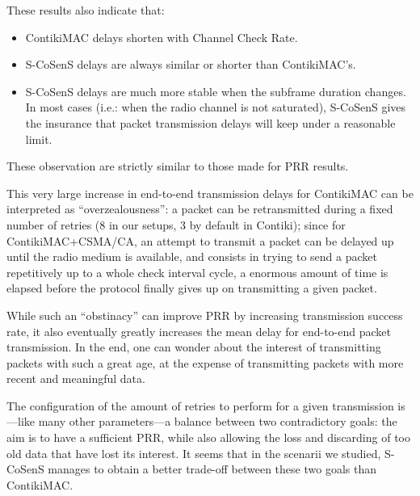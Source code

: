 \documentclass[12pt,a4paper]{article}
\begin{document}
\begin{observ}
These results also indicate that:

\begin{itemize}

\item ContikiMAC delays shorten with Channel Check Rate.

\item S-CoSenS delays are always similar or shorter than ContikiMAC's.

\item S-CoSenS delays are much more stable when the subframe duration
      changes. In most cases (i.e.: when the radio channel is not saturated),
      S-CoSenS gives the insurance that packet transmission delays will keep
      under a reasonable limit.

\end{itemize}

These observation are strictly similar to those made for PRR results.
\end{observ}

This very large increase in end-to-end transmission delays for ContikiMAC
can be interpreted as ``overzealousness'': a packet can be retransmitted
during a fixed number of retries (8 in our setups, 3 by default in Contiki);
since for ContikiMAC+CSMA/CA, an attempt to transmit a packet can be delayed
up until the radio medium is available, and consists in trying to send
a packet repetitively up to a whole check interval cycle, a enormous
amount of time is elapsed before the protocol finally gives up
on transmitting a given packet.

While such an ``obstinacy'' can improve PRR by increasing transmission
success rate, it also eventually greatly increases the mean delay for
end-to-end packet transmission. In the end, one can wonder about the
interest of transmitting packets with such a great age, at the expense
of transmitting packets with more recent and meaningful data.

The configuration of the amount of retries to perform for a given
transmission is---like many other parameters---a balance between two
contradictory goals: the aim is to have a sufficient PRR, while also
allowing the loss and discarding of too old data that have lost its
interest. It seems that in the scenarii we studied, S-CoSenS manages
to obtain a better trade-off between these two goals than ContikiMAC.

\end{document}

